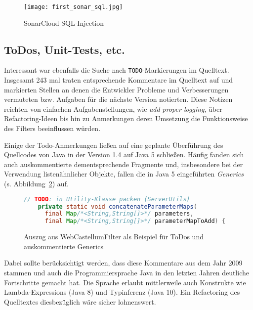 \begin{figure}
    \centering
    \texttt{[image: first\_sonar\_sql.jpg]}
    \caption{SonarCloud SQL-Injection}
    \label{fig:my_sonar2}
\end{figure}



\subsection{ToDos, Unit-Tests,  etc.}

Interessant war ebenfalls die Suche nach \verb=TODO=-Markierungen im Quelltext. Insgesamt 243 mal traten entsprechende Kommentare im Quelltext auf und markierten Stellen an denen die Entwickler Probleme und Verbesserungen vermuteten bzw. Aufgaben für die nächste Version notierten. Diese Notizen reichten von einfachen Aufgabenstellungen, wie \glqq\emph{add proper logging}\grqq, über Refactoring-Ideen bis hin zu Anmerkungen deren Umsetzung die Funktionsweise des Filters beeinflussen würden. 

Einige der Todo-Anmerkungen ließen auf eine geplante Überführung des Quellcodes von Java in der Version 1.4 auf Java 5 schließen. Häufig fanden sich auch auskommentierte dementsprechende Fragmente und, insbesondere bei der Verwendung listenähnlicher Objekte, fallen die in Java 5 eingeführten \emph{Generics} (s. Abbildung~\ref{fig:my_l2}) auf.

\begin{figure}[h]
  \begin{small}
    \begin{lstlisting}[language=java]
    // TODO: in Utility-Klasse packen (ServerUtils)
    private static void concatenateParameterMaps(
      final Map/*<String,String[]>*/ parameters, 
      final Map/*<String,String[]>*/ parameterMapToAdd) {
    \end{lstlisting}
  \end{small}
  \caption{Auszug aus WebCastellumFilter als Beispiel für ToDos und auskommentierte Generics}
  \label{fig:my_l2}
\end{figure}
  
Dabei sollte berücksichtigt werden, dass diese Kommentare aus dem Jahr 2009 stammen und auch die Programmiersprache Java in den letzten Jahren deutliche Fortschritte gemacht hat. Die Sprache erlaubt mittlerweile auch Konstrukte wie Lambda-Expressions (Java 8) und Typinferenz (Java 10). Ein Refactoring des Quelltextes diesbezüglich wäre sicher lohnenswert.

